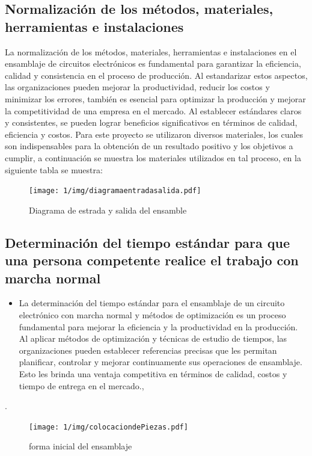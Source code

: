     \subsection{Normalización de los métodos, materiales, herramientas e instalaciones}
    
    La normalización de los métodos, materiales, herramientas e instalaciones en el ensamblaje de circuitos electrónicos es fundamental para garantizar la eficiencia, calidad y consistencia en el proceso de producción. Al estandarizar estos aspectos, las organizaciones pueden mejorar la productividad, reducir los costos y minimizar los errores, también es esencial para optimizar la producción y mejorar la competitividad de una empresa en el mercado. Al establecer estándares claros y consistentes, se pueden lograr beneficios significativos en términos de calidad, eficiencia y costos.
    Para este proyecto se utilizaron diversos materiales, los
    cuales son indispensables para la obtención de un resultado positivo y los objetivos a cumplir, a continuación se muestra los materiales utilizados en tal proceso, en la siguiente tabla se muestra:
     \begin{figure}[H] 
            \centering
            \texttt{[image: 1/img/diagramaentradasalida.pdf]}
            \caption{Diagrama de estrada y salida del ensamble}
            \label{fig:diagramaentradasalida}
        \end{figure}
    
    \subsection{Determinación del tiempo estándar para que una persona competente realice el trabajo con marcha normal}
    
    \begin{itemize}
    \item La determinación del tiempo estándar para el ensamblaje de un circuito electrónico con marcha normal y métodos de optimización es un proceso fundamental para mejorar la eficiencia y la productividad en la producción. Al aplicar métodos de optimización y técnicas de estudio de tiempos, las organizaciones pueden establecer referencias precisas que les permitan planificar, controlar y mejorar continuamente sus operaciones de ensamblaje. Esto les brinda una ventaja competitiva en términos de calidad, costos y tiempo de entrega en el mercado.\cite{Groover},\cite{Niebel}
    \end{itemize}.
      \begin{figure}[H] 
            \centering
            \texttt{[image: 1/img/colocaciondePiezas.pdf]}
            \caption{forma inicial del ensamblaje}
            \label{fig:Colocacion de Piezas}
        \end{figure}
